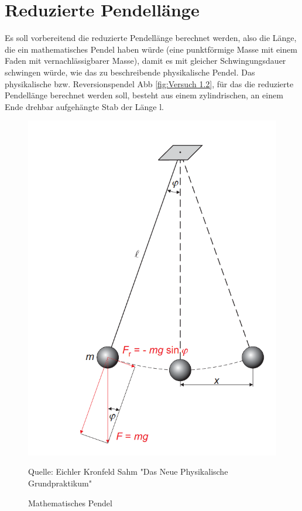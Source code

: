 \section{Reduzierte Pendellänge}

Es soll vorbereitend die reduzierte Pendellänge berechnet werden, also die Länge, die ein mathematisches Pendel haben würde (eine punktförmige Masse mit einem Faden mit vernachlässigbarer Masse), damit es mit gleicher Schwingungsdauer schwingen würde, wie das zu beschreibende physikalische Pendel. Das physikalische bzw. Reversionspendel Abb \ref{fig:Versuch 1.2}, für das die reduzierte Pendellänge berechnet werden soll, besteht aus einem zylindrischen, an einem Ende drehbar aufgehängte Stab der Länge l.

\begin{figure}[ht]
    \centering
    \includegraphics[scale=0.3]{Pendel/Protokoll/fig/Mathematisches Pendel.png}
    \caption{Mathematisches Pendel}
    \label{fig:Mathematisches Pendel}
    Quelle: Eichler Kronfeld Sahm "Das Neue Physikalische Grundpraktikum"
\end{figure}

